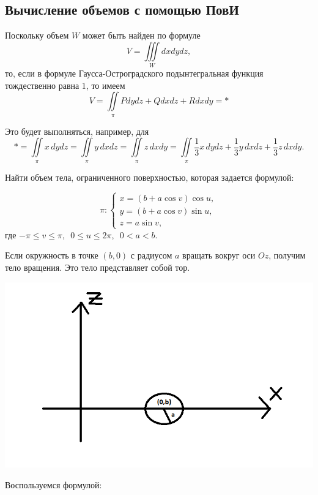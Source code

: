 \documentclass[../../main.tex]{subfiles}
\begin{document}
	
	
	\subsection{Вычисление объемов с помощью ПовИ}
	Поскольку объем $W$ может быть найден по формуле
	\[ V = \iiint \limits_W dx dy dz, \]
	то, если в формуле Гаусса-Остроградского подынтегральная функция тождественно 
	равна $1$, то имеем
	\[ V = \iint \limits_{\pi} Pdydz+Qdxdz+Rdxdy = * \]
	
	Это будет выполняться, например, для
	\[ *=  \iint \limits_{\pi} x \, dydz = \iint \limits_{\pi} y \, dxdz = \iint 
	\limits_{\pi} z \, dxdy = \iint \limits_{\pi}  \frac{1}{3} x \, dydz + 
	\frac{1}{3} y \, dxdz + \frac{1}{3} z \, dxdy. \]
	
	\begin{example}
	
	Найти объем тела, ограниченного поверхностью, которая задается формулой:
	
	\[ \pi:\begin{cases} x=\left( b + a \cos{v} \right) \cos{u}, \\ 
	y = \left( b + a \cos{v} \right) \sin{u}, \\ 
	z= a \sin{v},
	\end{cases} \]
	где
	$- \pi \leq v \leq \pi$,\,\
	$0 \leq u \leq 2\pi$,\,\
	$0 < a < b$.
	
	Если окружность в точке $(b,0)$ с радиусом $a$ вращать вокруг оси $Oz$, 
	получим тело вращения. Это тело представляет собой тор.
	\begin{center}
		\includegraphics[scale = 0.8]{lec_25_Thor_POVI}
	\end{center}
	
	Воспользуемся формулой:
	

\end{example}
\end{document}
